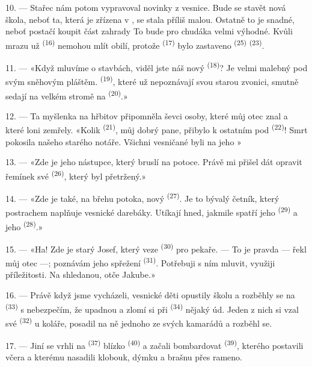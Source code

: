 10. --- Stařec nám potom vypravoval novinky z vesnice. Bude se stavět nová škola,
neboť ta, která je zřízena v , se stala příliš malou. Ostatně to
je snadné, neboť postačí koupit část zahrady  To bude pro chudáka
velmi výhodné. Kvůli mrazu už  
\textsuperscript{(16)} nemohou mlít obilí, protože  \textsuperscript{(17)}
bylo zastaveno  \textsuperscript{(25)} 
\textsuperscript{(23)}.

11. --- «Když mluvíme o stavbách, viděl jste náš nový 
\textsuperscript{(18)}? Je velmi malebný pod svým sněhovým pláštěm. 
\textsuperscript{(19)}, které už nepoznávají svou starou zvonici, smutně sedají na
velkém stromě na  \textsuperscript{(20)}.»

12. --- Ta myšlenka na hřbitov připomněla ševci osoby, které můj otec znal a které
loni zemřely. «Kolik  \textsuperscript{(21)}, můj dobrý pane, přibylo k
ostatním pod  \textsuperscript{(22)}! Smrt pokosila našeho starého
notáře. Všichni vesničané byli na jeho »

13. --- «Zde je jeho nástupce, který bruslí na potoce. Právě mi přišel dát opravit
řemínek své  \textsuperscript{(26)}, který byl přetržený.»

14. --- «Zde je také, na břehu potoka, nový 
\textsuperscript{(27)}. Je to bývalý četník, který postrachem naplňuje vesnické
darebáky. Utíkají hned, jakmile spatří jeho  \textsuperscript{(29)} a
jeho  \textsuperscript{(28)}.»

15. --- «Ha! Zde je starý Josef, který veze 
\textsuperscript{(30)} pro pekaře. --- To je pravda --- řekl můj otec ---; poznávám
jeho spřežení  \textsuperscript{(31)}. Potřebuji s ním mluvit, využiji
příležitosti. Na shledanou, otče Jakube.»

16. --- Právě když jsme vycházeli, vesnické děti opustily školu a rozběhly se na
 \textsuperscript{(33)} s nebezpečím, že upadnou a zlomí si při
 \textsuperscript{(34)} nějaký úd. Jeden z nich si vzal své 
\textsuperscript{(32)} u koláře, posadil na ně jednoho ze svých kamarádů a rozběhl se.

17. --- Jiní se vrhli na  \textsuperscript{(37)} blízko
 \textsuperscript{(40)} a začali bombardovat 
\textsuperscript{(39)}, kterého postavili včera a kterému nasadili klobouk, dýmku a
brašnu přes rameno.

